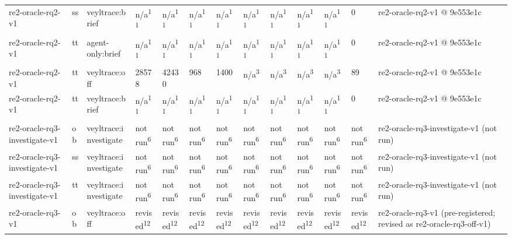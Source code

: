 \begin{table}[t]
\begin{tabular}{lllllllllllll}
re2-oracle-rq2-v1 & ss & veyltrace:brief & n/a\textsuperscript{11} & n/a\textsuperscript{11} & n/a\textsuperscript{11} & n/a\textsuperscript{11} & n/a\textsuperscript{11} & n/a\textsuperscript{11} & n/a\textsuperscript{11} & n/a\textsuperscript{11} & 0 & re2-oracle-rq2-v1 @ 9e553e1c \\
re2-oracle-rq2-v1 & tt & agent-only:brief & n/a\textsuperscript{11} & n/a\textsuperscript{11} & n/a\textsuperscript{11} & n/a\textsuperscript{11} & n/a\textsuperscript{11} & n/a\textsuperscript{11} & n/a\textsuperscript{11} & n/a\textsuperscript{11} & 0 & re2-oracle-rq2-v1 @ 9e553e1c \\
re2-oracle-rq2-v1 & tt & veyltrace:off & 28578 & 42430 & 968 & 1400 & n/a\textsuperscript{3} & n/a\textsuperscript{3} & n/a\textsuperscript{3} & n/a\textsuperscript{3} & 89 & re2-oracle-rq2-v1 @ 9e553e1c \\
re2-oracle-rq2-v1 & tt & veyltrace:brief & n/a\textsuperscript{11} & n/a\textsuperscript{11} & n/a\textsuperscript{11} & n/a\textsuperscript{11} & n/a\textsuperscript{11} & n/a\textsuperscript{11} & n/a\textsuperscript{11} & n/a\textsuperscript{11} & 0 & re2-oracle-rq2-v1 @ 9e553e1c \\
re2-oracle-rq3-investigate-v1 & ob & veyltrace:investigate & not run\textsuperscript{6} & not run\textsuperscript{6} & not run\textsuperscript{6} & not run\textsuperscript{6} & not run\textsuperscript{6} & not run\textsuperscript{6} & not run\textsuperscript{6} & not run\textsuperscript{6} & not run\textsuperscript{6} & re2-oracle-rq3-investigate-v1 (not run) \\
re2-oracle-rq3-investigate-v1 & ss & veyltrace:investigate & not run\textsuperscript{6} & not run\textsuperscript{6} & not run\textsuperscript{6} & not run\textsuperscript{6} & not run\textsuperscript{6} & not run\textsuperscript{6} & not run\textsuperscript{6} & not run\textsuperscript{6} & not run\textsuperscript{6} & re2-oracle-rq3-investigate-v1 (not run) \\
re2-oracle-rq3-investigate-v1 & tt & veyltrace:investigate & not run\textsuperscript{6} & not run\textsuperscript{6} & not run\textsuperscript{6} & not run\textsuperscript{6} & not run\textsuperscript{6} & not run\textsuperscript{6} & not run\textsuperscript{6} & not run\textsuperscript{6} & not run\textsuperscript{6} & re2-oracle-rq3-investigate-v1 (not run) \\
re2-oracle-rq3-v1 & ob & veyltrace:off & revised\textsuperscript{12} & revised\textsuperscript{12} & revised\textsuperscript{12} & revised\textsuperscript{12} & revised\textsuperscript{12} & revised\textsuperscript{12} & revised\textsuperscript{12} & revised\textsuperscript{12} & revised\textsuperscript{12} & re2-oracle-rq3-v1 (pre-registered; revised as re2-oracle-rq3-off-v1) \\

\end{tabular}
\end{table}

